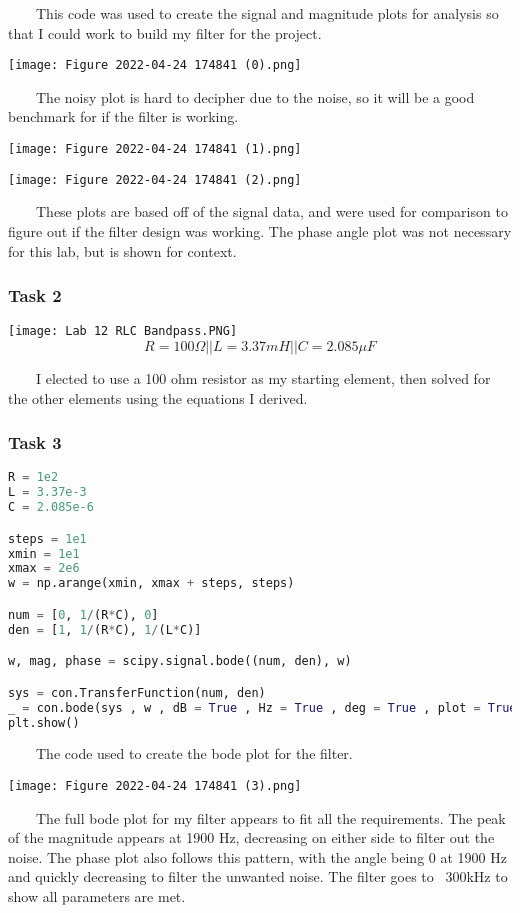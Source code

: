 \documentclass[11pt,a4]{article}
\begin{document}
\ \ \ \ This code was used to create the signal and magnitude plots for analysis so that I could work to build my filter for the project.

\texttt{[image: Figure 2022-04-24 174841 (0).png]}

\ \ \ \ The noisy plot is hard to decipher due to the noise, so it will be a good benchmark for if the filter is working.

\texttt{[image: Figure 2022-04-24 174841 (1).png]}

\texttt{[image: Figure 2022-04-24 174841 (2).png]}

\ \ \ \ These plots are based off of the signal data, and were used for comparison to figure out if the filter design was working. The phase angle plot was not necessary for this lab, but is shown for context.

\subsubsection{Task 2}

\texttt{[image: Lab 12 RLC Bandpass.PNG]}
$$R = 100\Omega|| L = 3.37 mH||C = 2.085 \mu F $$

\ \ \ \ I elected to use a 100 ohm resistor as my starting element, then solved for the other elements using the equations I derived.

\subsubsection{Task 3}

\begin{lstlisting}[language=Python]
R = 1e2
L = 3.37e-3
C = 2.085e-6

steps = 1e1
xmin = 1e1
xmax = 2e6
w = np.arange(xmin, xmax + steps, steps)

num = [0, 1/(R*C), 0]
den = [1, 1/(R*C), 1/(L*C)]

w, mag, phase = scipy.signal.bode((num, den), w)

sys = con.TransferFunction(num, den)
_ = con.bode(sys , w , dB = True , Hz = True , deg = True , plot = True)
plt.show()
\end{lstlisting}

\ \ \ \ The code used to create the bode plot for the filter.

\texttt{[image: Figure 2022-04-24 174841 (3).png]}

\ \ \ \ The full bode plot for my filter appears to fit all the requirements. The peak of the magnitude appears at 1900 Hz, decreasing on either side to filter out the noise. The phase plot also follows this pattern, with the angle being 0 at 1900 Hz and quickly decreasing to filter the unwanted noise. The filter goes to ~300kHz to show all parameters are met.
\end{document}
